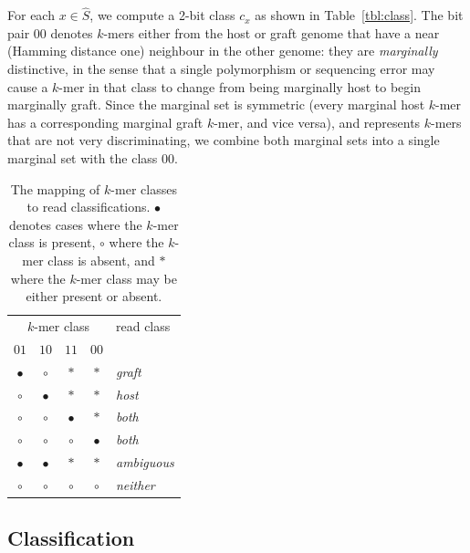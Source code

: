 \documentclass[twocolumn]{article}
\begin{document}
For each $x \in \hat{S}$, we compute a 2-bit class $c_x$ as shown
in Table~\ref{tbl:class}.  The bit pair $00$ denotes $k$-mers either
from the host or graft genome that have a near (Hamming distance one)
neighbour in the other genome: they are \textit{marginally} distinctive,
in the sense that a single polymorphism or sequencing error may cause
a $k$-mer in that class to change from being marginally host to begin
marginally graft.  Since the marginal set is symmetric (every marginal
host $k$-mer has a corresponding marginal graft $k$-mer, and vice versa),
and represents $k$-mers that are not very discriminating, we combine
both marginal sets into a single marginal set with the class $00$.

\begin{table}
\label{tbl:classes}
\begin{center}
\begin{tabular}{|cccc|l|}
\hline
\multicolumn{4}{|c|}{$k$-mer class} & read class \\
$01$        & $10$      & $11$  & $00$ & \\
\hline
$\bullet$   & $\circ$   &    $\ast$ &    $\ast$ & \textit{graft}          \\
$\circ$     & $\bullet$ &    $\ast$ &    $\ast$ & \textit{host}           \\
$\circ$     & $\circ$   & $\bullet$ &    $\ast$ & \textit{both}           \\
$\circ$     & $\circ$   & $\circ$   & $\bullet$ & \textit{both}           \\
$\bullet$   & $\bullet$ &    $\ast$ &    $\ast$ & \textit{ambiguous}      \\
$\circ$     & $\circ$   & $\circ$   &   $\circ$ & \textit{neither}        \\
\hline
\end{tabular}
\caption{The mapping of $k$-mer classes to read classifications.
$\bullet$ denotes cases where the $k$-mer class is present, $\circ$ where the $k$-mer class is absent,
and $\ast$ where the $k$-mer class may be either present or absent.}
\end{center}
\end{table}

\subsection{Classification}
\end{document}
